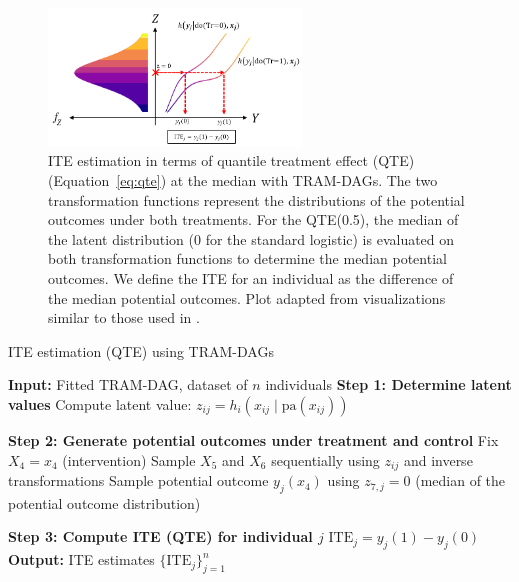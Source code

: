 \begin{figure}[H]
\centering
\includegraphics[width=0.6\textwidth]{img/potential_outcomes_y.png}
\caption{ITE estimation in terms of quantile treatment effect (QTE) (Equation~\ref{eq:qte}) at the median with TRAM-DAGs. The two transformation functions represent the distributions of the potential outcomes under both treatments. For the QTE(0.5), the median of the latent distribution (0 for the standard logistic) is evaluated on both transformation functions to determine the median potential outcomes. We define the ITE for an individual as the difference of the median potential outcomes. Plot adapted from visualizations similar to those used in \citet{sick2025}.}
\label{fig:exp4_potential_outcomes}
\end{figure}


\begin{algorithm}
\caption{ITE estimation (QTE) using TRAM-DAGs}
\label{alg:ite_qte}
\begin{algorithmic}
\State \textbf{Input:} Fitted TRAM-DAG, dataset of $n$ individuals
  \State \textbf{Step 1: Determine latent values}
    \State Compute latent value: $z_{ij} = h_i(x_{ij} \mid \text{pa}(x_{ij}))$
  \EndFor

  \State \textbf{Step 2: Generate potential outcomes under treatment and control}
   
    \State Fix $X_4 = x_4$ (intervention)
    \State Sample $X_5$ and $X_6$ sequentially using $z_{ij}$ and inverse transformations
    \State Sample potential outcome $y_j(x_4)$ using $z_{7,j} = 0$ (median of the potential outcome distribution)

  \EndFor

  \State \textbf{Step 3: Compute ITE (QTE) for individual $j$}
  \State $\text{ITE}_j = y_j(1) - y_j(0)$  %
\EndFor
\State \textbf{Output:} ITE estimates $\{\text{ITE}_j\}_{j=1}^n$
\end{algorithmic}
\end{algorithm}


